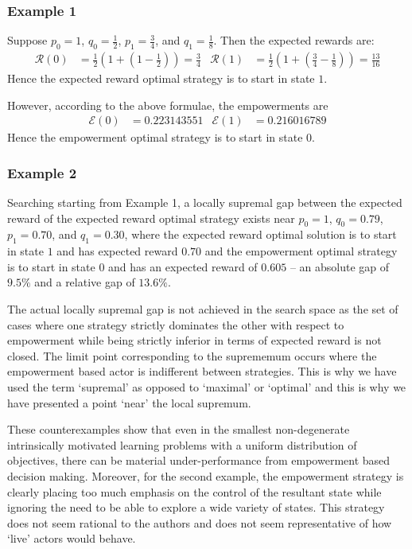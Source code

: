 \documentclass{article}
\newcommand{\Ee}{\mathcal{E}}
\newcommand{\Rr}{\mathcal{R}}
\begin{document}
\subsubsection{Example 1}
Suppose $p_0=1$, $q_0=\frac{1}{2}$, $p_1=\frac{3}{4}$, and $q_1 = \frac{1}{8}$. Then the expected rewards are:
\begin{align*}
\Rr(0) &= \frac{1}{2}\left(1+\left(1-\frac{1}{2}\right)\right)=\frac{3}{4} & 
\Rr(1) &= \frac{1}{2}\left(1+\left(\frac{3}{4}-\frac{1}{8}\right)\right)=\frac{13}{16}
\end{align*}
Hence the expected reward optimal strategy is to start in state $1$.

However, according to the above formulae, the empowerments are
\begin{align*}
\Ee(0)&=0.223143551 & 
\Ee(1)&=0.216016789 
\end{align*}
Hence the empowerment optimal strategy is to start in state $0$.

\subsubsection{Example 2}
Searching starting from Example 1, a locally supremal gap between the expected reward of the expected reward optimal strategy exists near $p_0=1$, $q_0=0.79$, $p_1=0.70$, and $q_1 = 0.30$, where the expected reward optimal solution is to start in state $1$ and has expected reward $0.70$ and the empowerment optimal strategy is to start in state $0$ and has an expected reward of $0.605$ -- an absolute gap of $9.5\%$ and a relative gap of $13.6\%$. 

The actual locally supremal gap is not achieved in the search space as the set of cases where one strategy strictly dominates the other with respect to empowerment while being strictly inferior in terms of expected reward is not closed. The limit point corresponding to the suprememum occurs where the empowerment based actor is indifferent between strategies. This is why we have used the term `supremal' as opposed to `maximal' or `optimal' and this is why we have presented a point `near' the local supremum.

These counterexamples show that even in the smallest non-degenerate intrinsically motivated learning problems with a uniform distribution of objectives, there can be material under-performance from empowerment based decision making. Moreover, for the second example, the empowerment strategy is clearly placing too much emphasis on the control of the resultant state while ignoring the need to be able to explore a wide variety of states. This strategy does not seem rational to the authors and does not seem representative of how `live' actors would behave.
\end{document}
